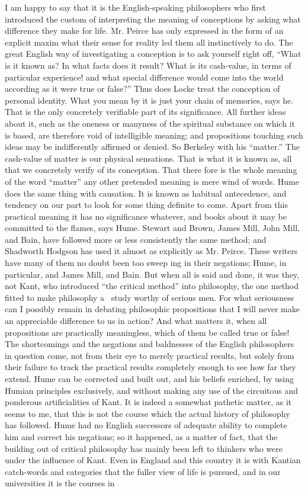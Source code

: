 \documentclass[]{article}
\begin{document}
I am happy to say that it is the English-speaking philosophers who first introduced the custom of interpreting the meaning of conceptions by asking what difference they make for life. Mr. Peirce has only expressed in the form of an explicit maxim what their sense for reality led them all instinctively to do. The great English way of investigating a conception is to ask yourself right off, ``What is it known as? In what facts does it result? What is its cash-value, in terms of particular experience! and what special difference would come into the world according as it were true or false?'' Thus does Locke treat the conception of personal identity. What you mean by it is just your chain of memories, says he. That is the only concretely verifiable part of its significance. All further ideas about it, such as the oneness or manyness of the spiritual substance on which it is based, are therefore void of intelligible meaning; and propositions touching such ideas may be indifferently affirmed or denied. So Berkeley with his ``matter.'' The cash-value of matter is our physical sensations. That is what it is known as, all that we concretely verify of its conception. That there fore is the whole meaning of the word ``matter'' any other pretended meaning is mere wind of words. Hume does the same thing with causation. It is known as habitual antecedence, and tendency on our part to look for some thing definite to come. Apart from this practical meaning it has no significance whatever, and books about it may be committed to the flames, says Hume. Stewart and Brown, James Mill, John Mill, and Bain, have followed more or less consistently the same method; and Shadworth Hodgson has used it almost as explicitly as Mr. Peirce. These writers have many of them no doubt been too sweep ing in their negations; Hume, in particular, and James Mill, and Bain. But when all is said and done, it was they, not Kant, who introduced ``the critical method'' into philosophy, the one method fitted to make philosophy a \ study worthy of serious men. For what seriousness can I possibly remain in debating philosophic propositions that I will never make an appreciable difference to us in action? And what matters it, when all propositions are practically meaningless, which of them be called true or false! The shortcomings and the negations and baldnesses of the English philosophers in question come, not from their eye to merely practical results, but solely from their failure to track the practical results completely enough to see how far they extend. Hume can be corrected and built out, and his beliefs enriched, by using Humian principles exclusively, and without making any use of the circuitous and ponderous artificialities of Kant. It is indeed a somewhat pathetic matter, as it seems to me, that this is not the course which the actual history of philosophy has followed. Hume had no English successors of adequate ability to complete him and correct his negations; so it happened, as a matter of fact, that the building out of critical philosophy has mainly been left to thinkers who were under the influence of Kant. Even in England and this country it is with Kantian catch-words and categories that the fuller view of life is pursued, and in our universities it is the courses in 
\end{document}
